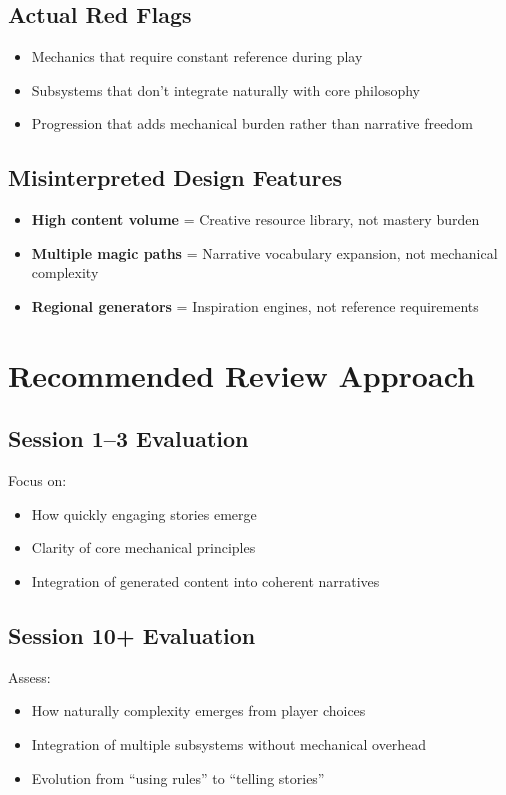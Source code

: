 \documentclass[11pt]{article}
\begin{document}
\subsection{Actual Red Flags}
\begin{itemize}
    \item Mechanics that require constant reference during play
    \item Subsystems that don't integrate naturally with core philosophy
    \item Progression that adds mechanical burden rather than narrative freedom
\end{itemize}

\subsection{Misinterpreted Design Features}
\begin{itemize}
    \item \textbf{High content volume} = Creative resource library, not mastery burden
    \item \textbf{Multiple magic paths} = Narrative vocabulary expansion, not mechanical complexity
    \item \textbf{Regional generators} = Inspiration engines, not reference requirements
\end{itemize}

\section{Recommended Review Approach}

\subsection{Session 1--3 Evaluation}
Focus on:
\begin{itemize}
    \item How quickly engaging stories emerge
    \item Clarity of core mechanical principles
    \item Integration of generated content into coherent narratives
\end{itemize}

\subsection{Session 10+ Evaluation}
Assess:
\begin{itemize}
    \item How naturally complexity emerges from player choices
    \item Integration of multiple subsystems without mechanical overhead
    \item Evolution from ``using rules'' to ``telling stories''
\end{itemize}
\end{document}

